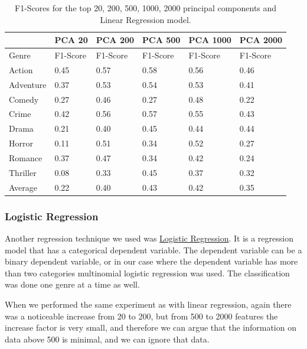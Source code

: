 \documentclass[11pt]{article}
\begin{document}
\begin{table}[h]
	\label{tab:lr_scores}
\begin{center}
	\begin{tabular}{| l | l | l | l | l | l |}
		\hline		         
                  & PCA 20    & PCA 200           & PCA 500     & PCA 1000  & PCA 2000 \\\hline
        Genre     & F1-Score  & F1-Score          & F1-Score    & F1-Score  & F1-Score\\\hline		
	  	Action    & 0.45      & 0.57 			  & 0.58        & 0.56      &  0.46\\
		Adventure & 0.37      & 0.53 			  & 0.54        & 0.53      &  0.41\\
		Comedy    & 0.27      & 0.46 			  & 0.27        & 0.48      &  0.22\\
		Crime     & 0.42      & 0.56 			  & 0.57        & 0.55      &  0.43\\
		Drama     & 0.21      & 0.40 			  & 0.45        & 0.44      &  0.44\\
		Horror    & 0.11      & 0.51 			  & 0.34        & 0.52      &  0.27\\
		Romance   & 0.37      & 0.47 			  & 0.34        & 0.42      &  0.24\\ 
		Thriller  & 0.08      & 0.33 			  & 0.45        & 0.37      &  0.32\\\hline
		Average   & 0.22      & 0.40 			  & 0.43        & 0.42      &  0.35\\\hline       
	\end{tabular} 
\end{center}
	\caption{F1-Scores for the top 20, 200, 500, 1000, 2000 principal components and Linear Regression model.}
\end{table}


\subsubsection{Logistic Regression}

Another regression technique we used was \href{https://en.wikipedia.org/wiki/Logistic_regression}{Logistic Regression}. It is a regression model that has a categorical dependent variable. The dependent variable can be a binary dependent variable, or in our case where the dependent variable has more than two categories multinomial logistic regression was used. The classification was done one genre at a time as well.

When we performed the same experiment as with linear regression, again there was a noticeable increase from 20 to 200, but from 500 to 2000 features the increase factor is very small, and therefore we can argue that the information on data above 500 is minimal, and we can ignore that data.
\end{document}
